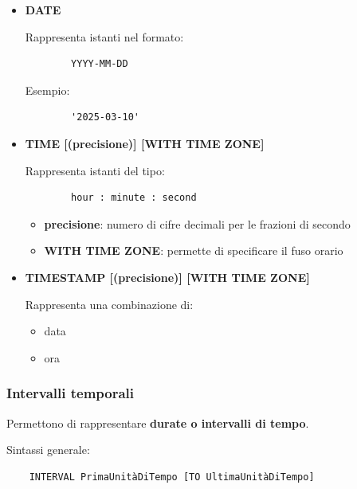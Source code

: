 \begin{itemize}
	
	\item \textbf{DATE}
	
	Rappresenta istanti nel formato:
	
	\begin{verbatim}
		YYYY-MM-DD
	\end{verbatim}
	
	Esempio:
	
	\begin{verbatim}
		'2025-03-10'
	\end{verbatim}
	
	\item \textbf{TIME [(precisione)] [WITH TIME ZONE]}
	
	Rappresenta istanti del tipo:
	
	\begin{verbatim}
		hour : minute : second
	\end{verbatim}
	
	\begin{itemize}
		\item \textbf{precisione}: numero di cifre decimali per le frazioni di secondo
		\item \textbf{WITH TIME ZONE}: permette di specificare il fuso orario
	\end{itemize}
	
	\item \textbf{TIMESTAMP [(precisione)] [WITH TIME ZONE]}
	
	Rappresenta una combinazione di:
	
	\begin{itemize}
		\item data
		\item ora
	\end{itemize}
	
\end{itemize}

\subsubsection*{Intervalli temporali}

Permettono di rappresentare \textbf{durate o intervalli di tempo}.

Sintassi generale:

\begin{verbatim}
	INTERVAL PrimaUnitàDiTempo [TO UltimaUnitàDiTempo]
\end{verbatim}

